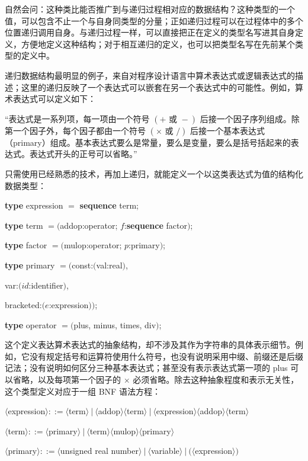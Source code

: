 自然会问：这种类比能否推广到与递归过程相对应的数据结构？这种类型的一个值，可以包含不止一个与自身同类型的分量；正如递归过程可以在过程体中的多个位置递归调用自身。与递归过程一样，可以直接把正在定义的类型名写进其自身定义，方便地定义这种结构；对于相互递归的定义，也可以把类型名写在先前某个类型的定义中。

递归数据结构最明显的例子，来自对程序设计语言中算术表达式或逻辑表达式的描述；这里的递归反映了一个表达式可以嵌套在另一个表达式中的可能性。例如，算术表达式可以定义如下：

“表达式是一系列项，每一项由一个符号 $(+ \text{ 或 } -)$ 后接一个因子序列组成。除第一个因子外，每个因子都由一个符号 $(\times \text{ 或 } /)$ 后接一个基本表达式（primary）组成。基本表达式要么是常量，要么是变量，要么是括号括起来的表达式。表达式开头的正号可以省略。”

只需使用已经熟悉的技术，再加上递归，就能定义一个以这类表达式为值的结构化数据类型：

\quad \textbf{type} expression $=$ \textbf{sequence} term;

\quad \textbf{type} term $= ($addop:operator; $f$:\textbf{sequence} factor$)$;

\quad \textbf{type} factor $= ($mulop:operator; $p$:primary$)$;

\quad \textbf{type} primary $= ($const:$($val:real$)$,

\tabto*{9.3em}var:$(id$:identifier$)$,

\tabto*{9.3em}bracketed:$(e$:expression$))$;

\quad \textbf{type} operator $= ($plus, minus, times, div$)$;

这个定义表达算术表达式的抽象结构，却不涉及其作为字符串的具体表示细节。例如，它没有规定括号和运算符使用什么符号，也没有说明采用中缀、前缀还是后缀记法；没有说明如何区分三种基本表达式；甚至没有表示表达式第一项的 plus 可以省略，以及每项第一个因子的 $\times$ 必须省略。除去这种抽象程度和表示无关性，这个类型定义对应于一组 BNF 语法方程：

\quad $\langle$expression$\rangle ::= \langle$term$\rangle\ |\ \langle$addop$\rangle \langle$term$\rangle\ |\ \langle$expression$\rangle \langle$addop$\rangle \langle$term$\rangle$

\quad $\langle$term$\rangle ::= \langle$primary$\rangle\ |\ \langle$term$\rangle\langle$mulop$\rangle\langle$primary$\rangle$

\quad $\langle$primary$\rangle ::= \langle$unsigned real number$\rangle\ |\ \langle$variable$\rangle\ |\ (\langle$expression$\rangle)$

